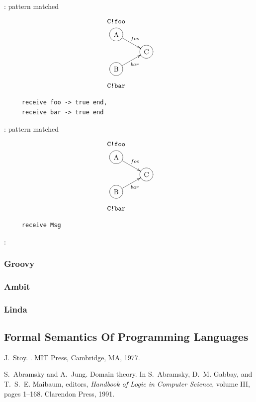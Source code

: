 \documentclass{myproc}
\begin{document}
  \w {}: pattern matched
  \[
  \xymatrix@-1.5pc{
   \txt{\tt{}C!foo} &&\\
     *++[o][F]\txt{A} \ar[rrd]^{foo} & & \\ 
            &&*++[o][F]\txt{C}\\
     *++[o][F]\txt{B} \ar[rru]_{bar} & & \\ 
     \txt{\tt{}C!bar} &&\\
  }\]
\begin{verbatim}
     receive foo -> true end,
     receive bar -> true end
\end{verbatim}
  \w {}: pattern matched
  \[
  \xymatrix@-1.5pc{
   \txt{\tt{}C!foo} &&\\
     *++[o][F]\txt{A} \ar[rrd]^{foo} & & \\ 
            &&*++[o][F]\txt{C}\\
     *++[o][F]\txt{B} \ar[rru]_{bar} & & \\ 
     \txt{\tt{}C!bar} &&\\
  }\]
\begin{verbatim}
     receive Msg
\end{verbatim}
  \eit
  
\w \textcolor{blue2}{}
  \bit
  \w {}
  \w {}: 
  \eit
\eit
\subsubsection{Groovy}
\subsubsection{Ambit}
\subsubsection{Linda}


\subsection{Formal Semantics Of Programming Languages}
\bit
\w J.~Stoy.
.
\newblock MIT Press, Cambridge, MA, 1977.

\w S.~Abramsky and A.~Jung.
\newblock Domain theory.
\newblock In S.~Abramsky, D.~M. Gabbay, and T.~S.~E. Maibaum, editors, {\em
  Handbook of Logic in Computer Science}, volume III, pages 1--168. Clarendon
  Press, 1991.
\end{document}
